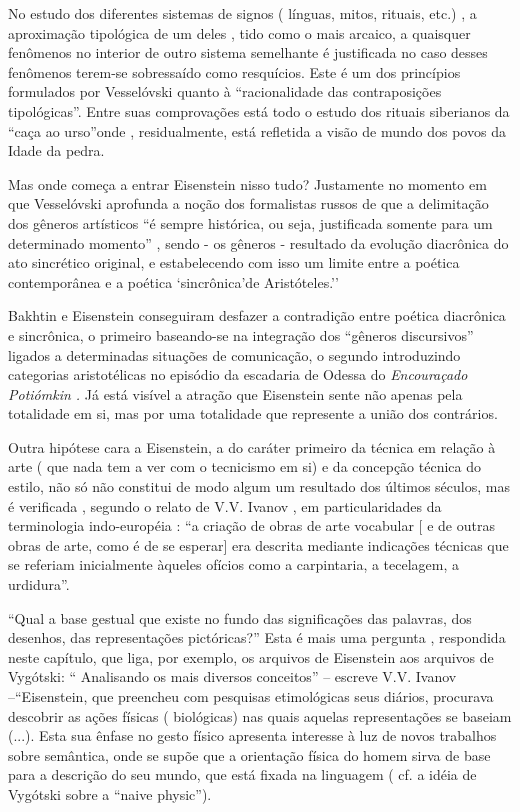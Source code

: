 No estudo dos diferentes sistemas de signos ( línguas, mitos, rituais,
etc.) , a aproximação tipológica de um deles , tido como o mais arcaico,
a quaisquer fenômenos no interior de outro sistema semelhante é
justificada no caso desses fenômenos terem-se sobressaído como
resquícios. Este é um dos princípios formulados por Vesselóvski quanto à
``racionalidade das contraposições tipológicas''. Entre suas
comprovações está todo o estudo dos rituais siberianos da ``caça ao
urso''onde , residualmente, está refletida a visão de mundo dos povos da
Idade da pedra.

Mas onde começa a entrar Eisenstein nisso tudo? Justamente no momento em
que Vesselóvski aprofunda a noção dos formalistas russos de que a
delimitação dos gêneros artísticos ``é sempre histórica, ou seja,
justificada somente para um determinado momento'' , sendo - os gêneros -
resultado da evolução diacrônica do ato sincrético original, e
estabelecendo com isso um limite entre a poética contemporânea e a
poética `sincrônica'de Aristóteles.''

Bakhtin e Eisenstein conseguiram desfazer a contradição entre poética
diacrônica e sincrônica, o primeiro baseando-se na integração dos
``gêneros discursivos'' ligados a determinadas situações de comunicação,
o segundo introduzindo categorias aristotélicas no episódio da escadaria
de Odessa do \emph{Encouraçado Potiómkin .} Já está visível a atração
que Eisenstein sente não apenas pela totalidade em si, mas por uma
totalidade que represente a união dos contrários.

Outra hipótese cara a Eisenstein, a do caráter primeiro da técnica em
relação à arte ( que nada tem a ver com o tecnicismo em si) e da
concepção técnica do estilo, não só não constitui de modo algum um
resultado dos últimos séculos, mas é verificada , segundo o relato de
V.V. Ivanov , em particularidades da terminologia indo-européia : ``a
criação de obras de arte vocabular {[} e de outras obras de arte, como é
de se esperar{]} era descrita mediante indicações técnicas que se
referiam inicialmente àqueles ofícios como a carpintaria, a tecelagem, a
urdidura''.

``Qual a base gestual que existe no fundo das significações das
palavras, dos desenhos, das representações pictóricas?'' Esta é mais uma
pergunta , respondida neste capítulo, que liga, por exemplo, os arquivos
de Eisenstein aos arquivos de Vygótski: `` Analisando os mais diversos
conceitos'' -- escreve V.V. Ivanov --``Eisenstein, que preencheu com
pesquisas etimológicas seus diários, procurava descobrir as ações
físicas ( biológicas) nas quais aquelas representações se baseiam (...).
Esta sua ênfase no gesto físico apresenta interesse à luz de novos
trabalhos sobre semântica, onde se supõe que a orientação física do
homem sirva de base para a descrição do seu mundo, que está fixada na
linguagem ( cf. a idéia de Vygótski sobre a ``naive physic'').

